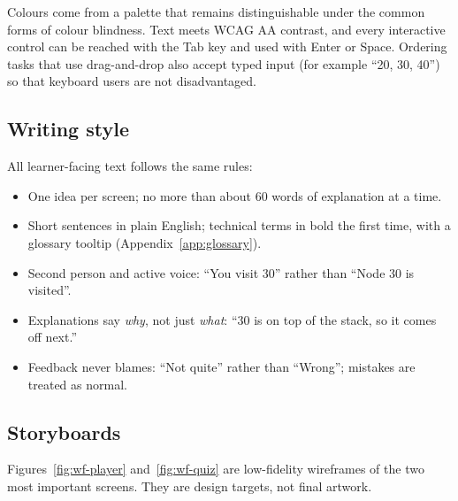 \documentclass[11pt,a4paper]{article}
\begin{document}
Colours come from a palette that remains distinguishable under the common forms of colour
blindness. Text meets WCAG AA contrast, and every interactive control can be reached with the Tab
key and used with Enter or Space. Ordering tasks that use drag-and-drop also accept typed input
(for example ``20, 30, 40'') so that keyboard users are not disadvantaged.

\subsection{Writing style}

All learner-facing text follows the same rules:

\begin{itemize}
  \item One idea per screen; no more than about 60 words of explanation at a time.
  \item Short sentences in plain English; technical terms in bold the first time, with a glossary
        tooltip (Appendix~\ref{app:glossary}).
  \item Second person and active voice: ``You visit 30'' rather than ``Node 30 is visited''.
  \item Explanations say \emph{why}, not just \emph{what}: ``30 is on top of the stack, so it comes
        off next.''
  \item Feedback never blames: ``Not quite'' rather than ``Wrong''; mistakes are treated as normal.
\end{itemize}

\subsection{Storyboards}

Figures~\ref{fig:wf-player} and~\ref{fig:wf-quiz} are low-fidelity wireframes of the two most
important screens. They are design targets, not final artwork.
\end{document}
